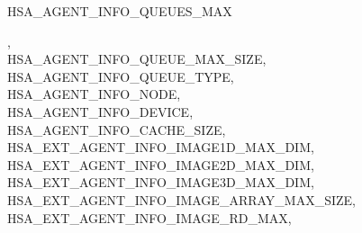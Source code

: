 \documentclass[final]{book}
\newcommand{\reftyp}[1]{#1}
\newcommand{\refenu}[1]{\reftyp{#1}}
\newenvironment{mylongtable}{\rowcolors{0}{lightgray}{lightgray}\longtable} {
\endlongtable}
\begin{document}
\begin{mylongtable}{@{}p{\textwidth}}
\hspace{1.7em}\hypertarget{group__agentinfo_1gga39d0684207d95717d96319573b3e4a42a06ac2144155abb87646396b0ac2c61f4}{\refenu{HSA_\-AGENT_\-INFO_\-QUEUES_\-MAX}},\\
\hspace{1.7em}\hypertarget{group__agentinfo_1gga39d0684207d95717d96319573b3e4a42acc88a2cb095e69df180ebee7aeb68c81}{\refenu{HSA_\-AGENT_\-INFO_\-QUEUE_\-MAX_\-SIZE}},\\
\hspace{1.7em}\hypertarget{group__agentinfo_1gga39d0684207d95717d96319573b3e4a42a46149fa502a210835171e0b66e16f988}{\refenu{HSA_\-AGENT_\-INFO_\-QUEUE_\-TYPE}},\\
\hspace{1.7em}\hypertarget{group__agentinfo_1gga39d0684207d95717d96319573b3e4a42a7e08d2bf6acfce669da4e810d3f7f28a}{\refenu{HSA_\-AGENT_\-INFO_\-NODE}},\\
\hspace{1.7em}\hypertarget{group__agentinfo_1gga39d0684207d95717d96319573b3e4a42a04660b9d69768cad7a7474310436ce88}{\refenu{HSA_\-AGENT_\-INFO_\-DEVICE}},\\
\hspace{1.7em}\hypertarget{group__agentinfo_1gga39d0684207d95717d96319573b3e4a42ae7fe21528c215249472e5836631759f4}{\refenu{HSA_\-AGENT_\-INFO_\-CACHE_\-SIZE}},\\
\hspace{1.7em}\hypertarget{group__agentinfo_1gga39d0684207d95717d96319573b3e4a42a9ea2d28a16c614f0cac5446c8a09aa15}{\refenu{HSA_\-EXT_\-AGENT_\-INFO_\-IMAGE1D_\-MAX_\-DIM}},\\
\hspace{1.7em}\hypertarget{group__agentinfo_1gga39d0684207d95717d96319573b3e4a42ae4adcd694c486dfd67e2d00f11fc2425}{\refenu{HSA_\-EXT_\-AGENT_\-INFO_\-IMAGE2D_\-MAX_\-DIM}},\\
\hspace{1.7em}\hypertarget{group__agentinfo_1gga39d0684207d95717d96319573b3e4a42ac7e605dad393b6f73722cb5c86a968e1}{\refenu{HSA_\-EXT_\-AGENT_\-INFO_\-IMAGE3D_\-MAX_\-DIM}},\\
\hspace{1.7em}\hypertarget{group__agentinfo_1gga39d0684207d95717d96319573b3e4a42aeb37004b5bac60cd22b069dde35888f9}{\refenu{HSA_\-EXT_\-AGENT_\-INFO_\-IMAGE_\-ARRAY_\-MAX_\-SIZE}},\\
\hspace{1.7em}\hypertarget{group__agentinfo_1gga39d0684207d95717d96319573b3e4a42a1aeb019ae81f2f942f27b674ed88168d}{\refenu{HSA_\-EXT_\-AGENT_\-INFO_\-IMAGE_\-RD_\-MAX}},\\

\end{mylongtable}
\end{document}
